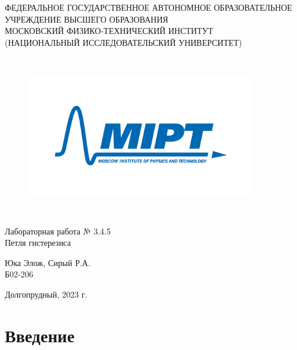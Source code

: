 \documentclass[a4paper,12pt]{article} %
\date{\today}
\begin{document}
\begin{center}
  \footnotesize{ФЕДЕРАЛЬНОЕ ГОСУДАРСТВЕННОЕ АВТОНОМНОЕ ОБРАЗОВАТЕЛЬНОЕ 			УЧРЕЖДЕНИЕ ВЫСШЕГО ОБРАЗОВАНИЯ}\\
  \footnotesize{МОСКОВСКИЙ ФИЗИКО-ТЕХНИЧЕСКИЙ ИНСТИТУТ\\(НАЦИОНАЛЬНЫЙ 			ИССЛЕДОВАТЕЛЬСКИЙ УНИВЕРСИТЕТ)}\\
  \hfill \break
  \hfill \break
  \hfill \break
  \hfill \break
\end{center}


\begin{figure}[h]
  \centering
  \includegraphics*[width=10cm,height=7cm,keepaspectratio]{mipt_eng_text_png.png}
  \label{fig:my_label}
\end{figure}


\begin{center}   
  \hfill \break
  \hfill \break
  \hfill \break
  \large{Лабораторная работа № 3.4.5\\ \hfill \break\Large{Петля гистерезиса}}\\
  \hfill \break
  \hfill \break
  \hfill \break
  \hfill \break
  \begin{flushright}
    Юка Элож, Сирый Р.А.\\
    Б02-206
  \end{flushright}
  \hfill \break
  \hfill \break
  \hfill \break
\end{center}
\hfill \break
\hfill \break
\hfill \break
\hfill \break
\begin{center}
  Долгопрудный, 2023 г.
\end{center}
\thispagestyle{empty}

\newpage
\section{Введение}
\end{document}
